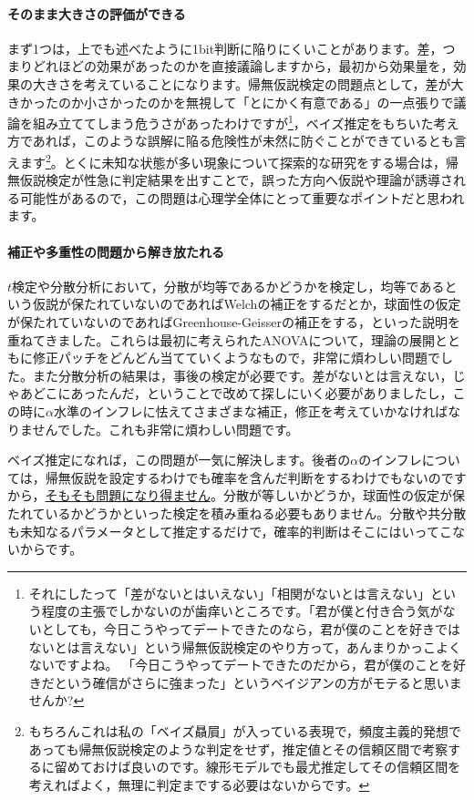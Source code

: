 \documentclass{ltjbook}
\begin{document}
\paragraph{そのまま大きさの評価ができる}
まず1つは，上でも述べたように1bit判断に陥りにくいことがあります。差，つまりどれほどの効果があったのかを直接議論しますから，最初から効果量を，効果の大きさを考えていることになります。帰無仮説検定の問題点として，差が大きかったのか小さかったのかを無視して「とにかく有意である」の一点張りで議論を組み立ててしまう危うさがあったわけですが\footnote{それにしたって「差がないとはいえない」「相関がないとは言えない」という程度の主張でしかないのが歯痒いところです。「君が僕と付き合う気がないとしても，今日こうやってデートできたのなら，君が僕のことを好きではないとは言えない」という帰無仮説検定のやり方って，あんまりかっこよくないですよね。 「今日こうやってデートできたのだから，君が僕のことを好きだという確信がさらに強まった」というベイジアンの方がモテると思いませんか? }，ベイズ推定をもちいた考え方であれば，このような誤解に陥る危険性が未然に防ぐことができているとも言えます\footnote{もちろんこれは私の「ベイズ贔屓」が入っている表現で，頻度主義的発想であっても帰無仮説検定のような判定をせず，推定値とその信頼区間で考察するに留めておけば良いのです。線形モデルでも最尤推定してその信頼区間を考えればよく，無理に判定までする必要はないからです。}。とくに未知な状態が多い現象について探索的な研究をする場合は，帰無仮説検定が性急に判定結果を出すことで，誤った方向へ仮説や理論が誘導される可能性があるので，この問題は心理学全体にとって重要なポイントだと思われます。

\paragraph{補正や多重性の問題から解き放たれる}
$t$検定や分散分析において，分散が均等であるかどうかを検定し，均等であるという仮説が保たれていないのであればWelchの補正をするだとか，球面性の仮定が保たれていないのであればGreenhouse-Geisserの補正をする，といった説明を重ねてきました。これらは最初に考えられたANOVAについて，理論の展開とともに修正パッチをどんどん当てていくようなもので，非常に煩わしい問題でした。また分散分析の結果は，事後の検定が必要です。差がないとは言えない，じゃあどこにあったんだ，ということで改めて探しにいく必要がありましたし，この時に$\alpha$水準のインフレに怯えてさまざまな補正，修正を考えていかなければなりませんでした。これも非常に煩わしい問題です。

ベイズ推定になれば，この問題が一気に解決します。後者の$\alpha$のインフレについては，帰無仮説を設定するわけでも確率を含んだ判断をするわけでもないのですから，\underline{そもそも問題になり得ません}。分散が等しいかどうか，球面性の仮定が保たれているかどうかといった検定を積み重ねる必要もありません。分散や共分散も未知なるパラメータとして推定するだけで，確率的判断はそこにはいってこないからです。
\end{document}

